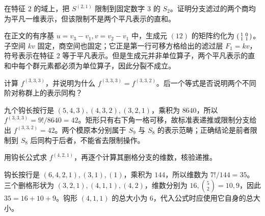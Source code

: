 \begin{exercise}\label{b5:ex:06-nonsplit-modular-branch}
	在特征 \(2\) 的域上，把 \(S^{(2,1)}\) 限制到固定数字 \(3\) 的 \(S_2\)。证明分支滤过的两个商均为平凡一维表示，但该限制不是两个平凡表示的直和。
\end{exercise}
\begin{solution}
	在正文的有序基 \(u=v_3-v_1,v=v_2-v_1\) 中，生成元 \((12)\) 的矩阵约化为
	\(\begin{psmallmatrix}1&0\\1&1\end{psmallmatrix}\)。子空间 \(kv\) 固定，商空间也固定；它正是第一行可移方格给出的滤过层 \(F_1=kv\)，符号表示在特征 \(2\) 等于平凡表示。但是生成元并非单位算子，两个平凡表示的直和中每个群元素都必须为单位算子，因此分裂不成立。
\end{solution}

\begin{exercise}\label{b5:ex:06-rectangle}
	计算 \(f^{(3,3,3)}\)，并说明为什么 \(f^{(3,3,3)}=f^{(3,3,2)}\)。后一个等式是否说明两个不同阶对称群上的表示同构？
\end{exercise}
\begin{solution}
	九个钩长按行是 \((5,4,3),(4,3,2),(3,2,1)\)，乘积为 \(8640\)，所以 \(f^{(3,3,3)}=9!/8640=42\)。矩形只有右下角一格可移，故标准表递推或限制分支给出 \(f^{(3,3,2)}=42\)。两个模原本分别属于 \(S_9\) 与 \(S_8\) 的表示范畴；正确结论是前者限制到 \(S_8\) 后同构于后者，不能省去限制操作。
\end{solution}

\begin{exercise}\label{b5:ex:06-421-dimension}
	用钩长公式求 \(f^{(4,2,1)}\)，再逐个计算其删格分支的维数，核验递推。
\end{exercise}
\begin{solution}
	钩长按行是 \((6,4,2,1),(3,1),(1)\)，乘积为 \(144\)，所以维数为 \(7!/144=35\)。三个删格形状为 \((3,2,1),(4,1,1),(4,2)\)，维数分别为 \(16,\binom52=10,9\)，因此 \(35=16+10+9\)。钩形 \((4,1,1)\) 的总大小为 \(6\)，代入公式时应使用它自身的总大小。
\end{solution}

